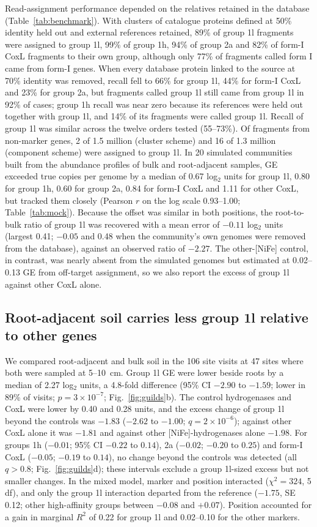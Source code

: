 \documentclass[11pt]{article}
\begin{document}
Read-assignment performance depended on the relatives retained in the database (Table~\ref{tab:benchmark}). With clusters of catalogue proteins defined at 50\% identity held out and external references retained, 89\% of group 1l fragments were assigned to group 1l, 99\% of group
1h, 94\% of group 2a and 82\% of form-I CoxL fragments to their own group, although only 77\% of fragments
called form I came from form-I genes. When every database protein linked to the source at 70\% identity was
removed, recall fell to 66\% for group 1l, 44\% for form-I CoxL and 23\% for group 2a, but fragments called
group 1l still came from group 1l in 92\% of cases; group 1h recall was near zero because its references were held out together with group 1l, and 14\% of its fragments were called group 1l. Recall of
group 1l was similar across the twelve orders tested (55--73\%). Of fragments from non-marker genes, 2 of 1.5
million (cluster scheme) and 16 of 1.3 million (component scheme) were assigned to group 1l. In 20 simulated communities built from the abundance profiles
of bulk and root-adjacent samples, GE exceeded true copies per genome by a median of 0.67 log$_2$ units for
group 1l, 0.80 for group 1h, 0.60 for group 2a, 0.84 for form-I CoxL and 1.11 for other CoxL, but tracked
them closely (Pearson $r$ on the log scale 0.93--1.00; Table~\ref{tab:mock}). Because the offset was
similar in both positions, the root-to-bulk ratio of group 1l was recovered with a mean error of $-0.11$
log$_2$ units (largest 0.41; $-0.05$ and 0.48 when the community's own genomes were removed from the
database), against an observed ratio of $-2.27$. The other-[NiFe] control, in contrast, was nearly absent
from the simulated genomes but estimated at 0.02--0.13 GE from off-target assignment, so we also report
the excess of group 1l against other CoxL alone.

\subsection*{Root-adjacent soil carries less group 1l relative to other genes}
We compared root-adjacent and bulk soil in the 106 site visits at 47 sites where both were sampled at
5--10~cm. Group 1l GE were lower beside roots by a median of 2.27 log$_2$ units, a 4.8-fold difference (95\%
CI $-2.90$ to $-1.59$; lower in 89\% of visits; $p=3\times10^{-7}$; Fig.~\ref{fig:guilds}b). The control
hydrogenases and CoxL were lower by 0.40 and 0.28 units, and the excess change of group 1l beyond the
controls was $-1.83$ ($-2.62$ to $-1.00$; $q=2\times10^{-6}$); against other CoxL alone it was $-1.81$ and
against other [NiFe]-hydrogenases alone $-1.98$. For groups 1h ($-0.01$; 95\% CI $-0.22$ to $0.14$), 2a
($-0.02$; $-0.20$ to $0.25$) and form-I CoxL ($-0.05$; $-0.19$ to $0.14$), no change beyond the controls was
detected (all $q>0.8$; Fig.~\ref{fig:guilds}d); these intervals exclude a group 1l-sized excess but not
smaller changes. In the mixed model,
marker and position interacted ($\chi^2=324$, 5 df), and only the group 1l interaction departed from the
reference ($-1.75$, SE 0.12; other high-affinity groups between $-0.08$ and $+0.07$). Position accounted for
a gain in marginal $R^2$ of 0.22 for group 1l and 0.02--0.10 for the other markers.
\end{document}

